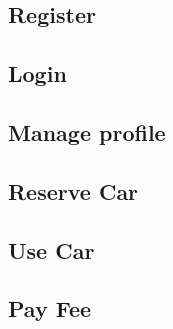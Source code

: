\subsection{Register}


\subsection{Login}


\subsection{Manage profile}


\subsection{Reserve Car}


\subsection{Use Car}


\subsection{Pay Fee}
